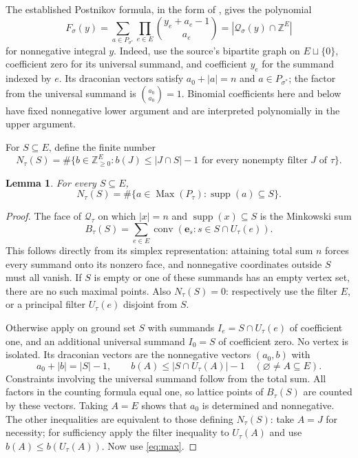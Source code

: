 \documentclass[11pt]{article}
\newtheorem{lemma}{Lemma}
\newcommand{\Q}{\mathcal Q}
\newcommand{\supp}{\operatorname{supp}}
\newcommand{\Max}{\operatorname{Max}}
\newcommand{\Z}{\mathbb Z}
\begin{document}
The established Postnikov formula, in the form of
\cite[Theorem 2.1 and Lemma 4.1]{AC}, gives the polynomial
\begin{equation}\label{eq:F}
 F_\sigma(y)=\sum_{a\in P_{\sigma^*}}
                      \prod_{e\in E}\binom{y_e+a_e-1}{a_e}
        =|\Q_\sigma(y)\cap\Z^E|
\end{equation}
for nonnegative integral $y$. Indeed, use the source's bipartite
graph on $E\sqcup\{0\}$, coefficient zero for its universal summand,
and coefficient $y_e$ for the summand indexed by $e$. Its draconian
vectors satisfy $a_0+|a|=n$ and $a\in P_{\sigma^*}$; the factor
from the universal summand is $\binom{a_0}{a_0}=1$.
Binomial coefficients here and below have fixed nonnegative lower
argument and are interpreted polynomially in the upper argument.

For $S\subseteq E$, define the finite number
\[
 N_\tau(S)=\#\{b\in\Z_{\ge0}^E:
       b(J)\le |J\cap S|-1\text{ for every nonempty filter $J$ of $\tau$}\}.
\]
\begin{lemma}\label{lem:support}
For every $S\subseteq E$,
\[
 N_\tau(S)=\#\{a\in\Max(P_\tau):\supp(a)\subseteq S\}.
\]
\end{lemma}
\begin{proof}
The face of $\Q_\tau$ on which $|x|=n$ and $\supp(x)\subseteq S$
is the Minkowski sum
\[
 B_\tau(S)=\sum_{e\in E}
            \operatorname{conv}(\mathbf e_s:s\in S\cap U_\tau(e)).
\]
This follows directly from its simplex representation: attaining
total sum $n$ forces every summand onto its nonzero face, and
nonnegative coordinates outside $S$ must all vanish.
If $S$ is empty or one of these summands has an empty vertex set,
there are no such maximal points. Also $N_\tau(S)=0$: respectively
use the filter $E$, or a principal filter $U_\tau(e)$ disjoint from $S$.

Otherwise apply \cite[Theorem 2.1]{AC} on ground set $S$ with
summands $I_e=S\cap U_\tau(e)$ of coefficient one, and an additional
universal summand $I_0=S$ of coefficient zero. No vertex is isolated.
Its draconian vectors are the nonnegative vectors $(a_0,b)$ with
\begin{equation}\label{eq:drac}
 a_0+|b|=|S|-1,\qquad
 b(A)\le |S\cap U_\tau(A)|-1\quad(\varnothing\ne A\subseteq E).
\end{equation}
Constraints involving the universal summand follow from the total sum.
All factors in the counting formula equal one, so lattice points of
$B_\tau(S)$ are counted by these vectors. Taking $A=E$ shows that
$a_0$ is determined and nonnegative. The other inequalities are
equivalent to those defining $N_\tau(S)$: take $A=J$ for necessity;
for sufficiency apply the filter inequality to $U_\tau(A)$ and use
$b(A)\le b(U_\tau(A))$. Now use \eqref{eq:max}.
\end{proof}
\end{document}
